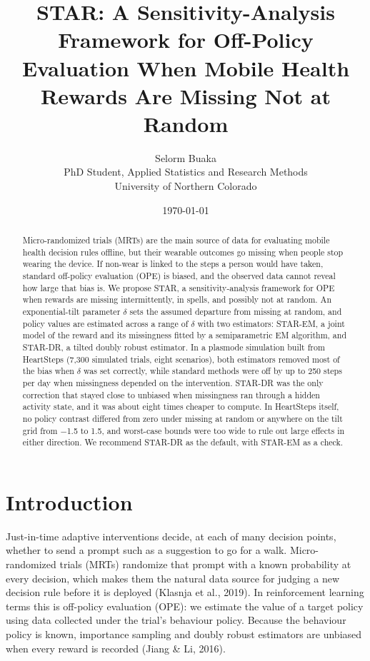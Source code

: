 \documentclass[12pt]{article}
\title{STAR: A Sensitivity-Analysis Framework for Off-Policy Evaluation When Mobile Health Rewards Are Missing Not at Random}
\author{Selorm Buaka\\PhD Student, Applied Statistics and Research Methods\\University of Northern Colorado}
\date{\today}
\begin{document}
\maketitle
\begin{abstract}

Micro-randomized trials (MRTs) are the main source of data for evaluating mobile health decision rules offline, but their wearable outcomes go missing when people stop wearing the device. If non-wear is linked to the steps a person would have taken, standard off-policy evaluation (OPE) is biased, and the observed data cannot reveal how large that bias is. We propose STAR, a sensitivity-analysis framework for OPE when rewards are missing intermittently, in spells, and possibly not at random. An exponential-tilt parameter $\delta$ sets the assumed departure from missing at random, and policy values are estimated across a range of $\delta$ with two estimators: STAR-EM, a joint model of the reward and its missingness fitted by a semiparametric EM algorithm, and STAR-DR, a tilted doubly robust estimator. In a plasmode simulation built from HeartSteps (7,300 simulated trials, eight scenarios), both estimators removed most of the bias when $\delta$ was set correctly, while standard methods were off by up to 250 steps per day when missingness depended on the intervention. STAR-DR was the only correction that stayed close to unbiased when missingness ran through a hidden activity state, and it was about eight times cheaper to compute. In HeartSteps itself, no policy contrast differed from zero under missing at random or anywhere on the tilt grid from $-$1.5 to 1.5, and worst-case bounds were too wide to rule out large effects in either direction. We recommend STAR-DR as the default, with STAR-EM as a check.

\end{abstract}

\section{Introduction}

Just-in-time adaptive interventions decide, at each of many decision points, whether to send a prompt such as a suggestion to go for a walk. Micro-randomized trials (MRTs) randomize that prompt with a known probability at every decision, which makes them the natural data source for judging a new decision rule before it is deployed (Klasnja et al., 2019). In reinforcement learning terms this is off-policy evaluation (OPE): we estimate the value of a target policy using data collected under the trial's behaviour policy. Because the behaviour policy is known, importance sampling and doubly robust estimators are unbiased when every reward is recorded (Jiang \& Li, 2016).
\end{document}
